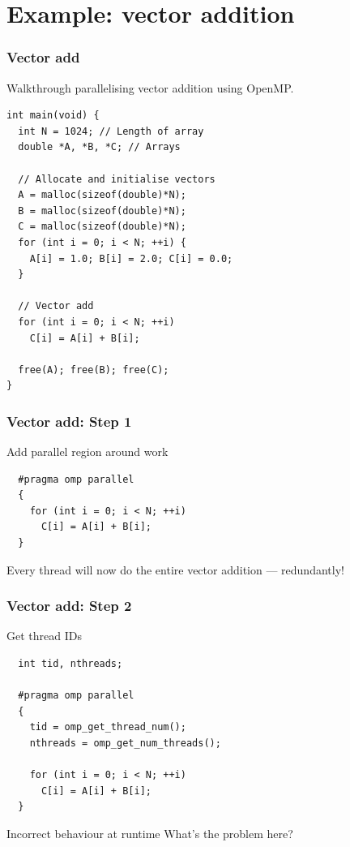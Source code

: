 \documentclass[aspectratio=169]{beamer}
\begin{document}
\section{Example: vector addition}
\begin{frame}[fragile]
\frametitle{Vector add}
Walkthrough parallelising vector addition using OpenMP.

\begin{verbatim}
int main(void) {
  int N = 1024; // Length of array
  double *A, *B, *C; // Arrays

  // Allocate and initialise vectors
  A = malloc(sizeof(double)*N);
  B = malloc(sizeof(double)*N);
  C = malloc(sizeof(double)*N);
  for (int i = 0; i < N; ++i) {
    A[i] = 1.0; B[i] = 2.0; C[i] = 0.0;
  }

  // Vector add
  for (int i = 0; i < N; ++i)
    C[i] = A[i] + B[i];

  free(A); free(B); free(C);
}
\end{verbatim}
\end{frame}

\begin{frame}[fragile]
\frametitle{Vector add: Step 1}
Add parallel region around work
\begin{verbatim}
  #pragma omp parallel
  {
    for (int i = 0; i < N; ++i)
      C[i] = A[i] + B[i];
  }
\end{verbatim}
Every thread will now do the entire vector addition --- redundantly!
\end{frame}

\begin{frame}[fragile]
\frametitle{Vector add: Step 2}
Get thread IDs
\begin{verbatim}
  int tid, nthreads;

  #pragma omp parallel
  {
    tid = omp_get_thread_num();
    nthreads = omp_get_num_threads();

    for (int i = 0; i < N; ++i)
      C[i] = A[i] + B[i];
  }
\end{verbatim}

\pause
\begin{alertblock}{Incorrect behaviour at runtime}
What's the problem here?
\end{alertblock}
\end{frame}
\end{document}

